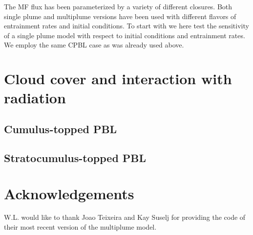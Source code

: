 \documentclass[dvipdfmx,a4paper,10pt]{article}
\begin{document}
The MF flux has been parameterized by a variety of different closures. Both single plume and multiplume versions have been used with different flavors of entrainment rates and initial conditions. To start with we here test the sensitivity of a single plume model with respect to initial conditions and entrainment rates. We employ the same CPBL case \citep{nieuwstadt93,witek11} as was already used above.



\section{Cloud cover and interaction with radiation}\label{sec:clouds}

\subsection{Cumulus-topped PBL}

\subsection{Stratocumulus-topped PBL}



\section{Acknowledgements}
W.L. would like to thank Joao Teixeira and Kay Suselj for providing the code of their most recent version of the multiplume model. 




%

 
\end{document}
